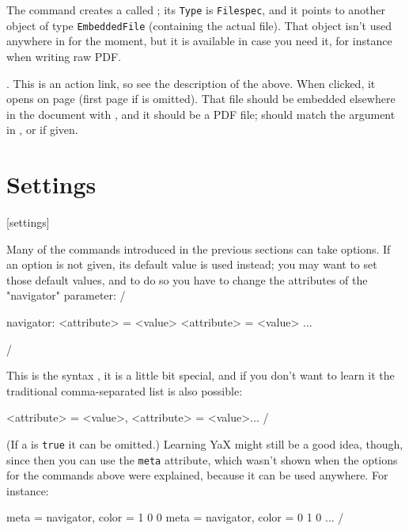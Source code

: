The command creates a  called ; its
\verb"Type" is \verb"Filespec", and it points to another object of type
\verb"EmbeddedFile" (containing the actual file). That object isn't used anywhere
in \navigator for the moment, but it is available in case you need it, for instance
when writing raw PDF.

\describe\openfilelink{}.
This is an action link, so see the description of the 
above. When clicked, it opens  on page 
(first page if  is omitted). That file should be embedded elsewhere
in the document with \jumpcom\embeddedfile, and it should be a PDF file;
 should match the  argument in \com\embeddedfile,
or  if given.






\section{Settings}[settings]

\description
Many of the commands introduced in the previous sections can take options.
If an option is not given, its default value is used instead; you may
want to set those default values, and to do so you have to change the
attributes of the \param"navigator" parameter:
\description/

\verbatim
\setparameter navigator:
  <attribute> = <value>
  <attribute> = <value>
...
\par
\verbatim/

This is the 
syntax , it is a little bit special, and if you don't want to learn it the
traditional comma-separated list is also possible:

\verbatim
{}
                 {<attribute> = <value>,
                  <attribute> = <value>...}
\verbatim/

(If a  is \verb"true" it can be omitted.)
Learning YaX might still be a good idea, though, since then you can
use the \verb"meta" attribute, which wasn't shown when the options for
the commands above were explained, because it can be used anywhere.
For instance:

\verbatim
{}
                 {meta  = navigator,
                  color = 1 0 0}
                 {meta  = navigator,
                  color = 0 1 0}
...
\verbatim/

